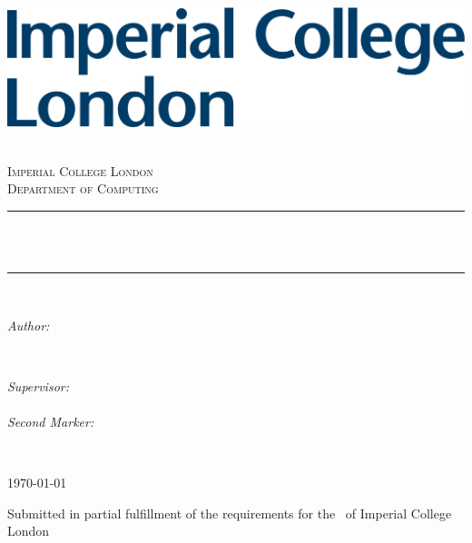 \begin{titlepage}

\newcommand{\HRule}{\rule{\linewidth}{0.5mm}}
\includegraphics[width=0.4\linewidth]{figures/imperial.png}
\bigskip \bigskip
\center %

\textsc{\LARGE \reporttype}\\[1.5cm]
\textsc{\Large Imperial College London}\\[0.5cm]
\textsc{\large Department of Computing}\\[0.5cm]

\makeatletter
\HRule \\[0.4cm]
{ \huge \bfseries \@title}\\%
\HRule \\[1.5cm]

\begin{minipage}{0.4\textwidth}
\begin{flushleft} \large
\emph{Author:}\\
\@author %
\end{flushleft}
\end{minipage}
~
\begin{minipage}{0.4\textwidth}
\begin{flushright} \large
\emph{Supervisor:} \\
\supervisor \\
\emph{Second Marker:} \\
\secondmarker
\end{flushright}
\end{minipage}\\[2cm]
\makeatother

{\large \today} %


\vfill %
Submitted in partial fulfillment of the requirements for the \degreetype ~of Imperial College London
    
\end{titlepage}